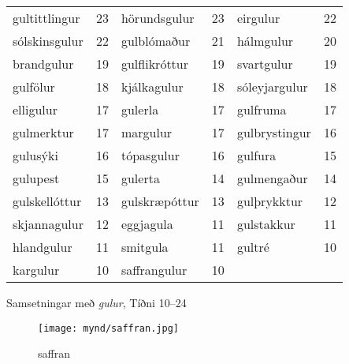 \documentclass[../samsetningasafn.tex]{subfiles}
\begin{document}
\begin{wordlist}[H]
\begin{tcolorbox}

	\setlength{\extrarowheight}{3pt}
	\begin{tabular}{BlBlBl}	
		gultittlingur		& 23		& 	
		hörundsgulur		& 23		& 
		eirgulur			& 22		\\ 
		sólskinsgulur		& 22		& 
		gulblómaður		& 21		& 	
		hálmgulur		& 20		\\ 	
		brandgulur		& 19		& 	
		gulflikróttur		& 19		& 	
		svartgulur		& 19		\\ 
		gulfölur			& 18		& 
		kjálkagulur		& 18		& 
		sóleyjargulur		& 18		\\ 
		elligulur			& 17		& 
		gulerla			& 17		& 
		gulfruma		& 17		\\ 
		gulmerktur		& 17		& 
		margulur		& 17		& 
		gulbrystingur		& 16		\\ 
		gulusýki			& 16		& 
		tópasgulur		& 16		& 	
		gulfura			& 15		\\ 
		gulupest			& 15		& 
		gulerta			& 14		& 	
		gulmengaður		& 14		\\ 
		gulskellóttur		& 13		& 
		gulskræpóttur	& 13		& 
		gulþrykktur		& 12		\\ 	
		skjannagulur		& 12		& 
		eggjagula		& 11		& 
		gulstakkur		& 11		\\ 
		hlandgulur		& 11		& 	
		smitgula			& 11		& 
		gultré			& 10		\\ 
		kargulur			& 10		& 
		saffrangulur		& 10		& 
						& 
	\end{tabular}
\end{tcolorbox}
	\caption{Samsetningar með \textit{gulur}, Tíðni 10--24}
	\label{listi:gult.10}
\end{wordlist}

\begin{figure}[H]
\begin{tcolorbox}
\centering
	\texttt{[image: mynd/saffran.jpg]}
\end{tcolorbox}
	\caption{saffran}
	\label{mynd:saffran}
\end{figure}
\end{document}
